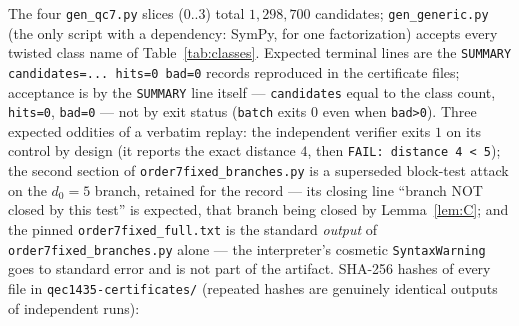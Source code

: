 \documentclass[11pt]{amsart}
\theoremstyle{plain}
\theoremstyle{definition}
\theoremstyle{remark}
\begin{document}
\noindent The four \texttt{gen\_qc7.py} slices ($0..3$) total
$1{,}298{,}700$ candidates; \texttt{gen\_generic.py} (the only script
with a dependency: SymPy, for one factorization) accepts every twisted
class name of Table~\ref{tab:classes}. Expected terminal lines are the
\texttt{SUMMARY candidates=... hits=0 bad=0} records reproduced in the
certificate files; acceptance is by the \texttt{SUMMARY} line itself ---
\texttt{candidates} equal to the class count, \texttt{hits=0},
\texttt{bad=0} --- not by exit status (\texttt{batch} exits $0$ even when
\texttt{bad>0}). Three expected oddities of a verbatim replay: the
independent verifier exits $1$ on its control by design (it reports the
exact distance $4$, then \texttt{FAIL: distance 4 < 5}); the second
section of \texttt{order7fixed\_branches.py} is a superseded block-test
attack on the $d_{0}=5$ branch, retained for the record --- its closing
line ``branch NOT closed by this test'' is expected, that branch being
closed by Lemma~\ref{lem:C}; and the pinned
\texttt{order7fixed\_full.txt} is the standard \emph{output} of
\texttt{order7fixed\_branches.py} alone --- the interpreter's cosmetic
\texttt{SyntaxWarning} goes to standard error and is not part of the
artifact. SHA-256 hashes of every file in
\texttt{qec1435-certificates/} (repeated hashes are genuinely identical
outputs of independent runs):
\end{document}
